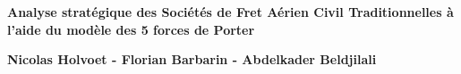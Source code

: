 
\begin{titlepage}
	\parindent=0pt
 
\addtolength{\wpXoffset}{-4.5cm}

	
	\hrulefill
	\begin{center}\bfseries\Huge
		\color{white}
		{Analyse stratégique des Sociétés de Fret Aérien Civil Traditionnelles à l'aide du modèle des 5 forces de Porter} 
	\end{center}
	\hrulefill
	
	\vspace*{1cm}
	\begin{center}\bfseries\Large
			\color{white}
		{Nicolas Holvoet - Florian Barbarin - Abdelkader Beldjilali}
		
	\end{center}
	


\end{titlepage}
